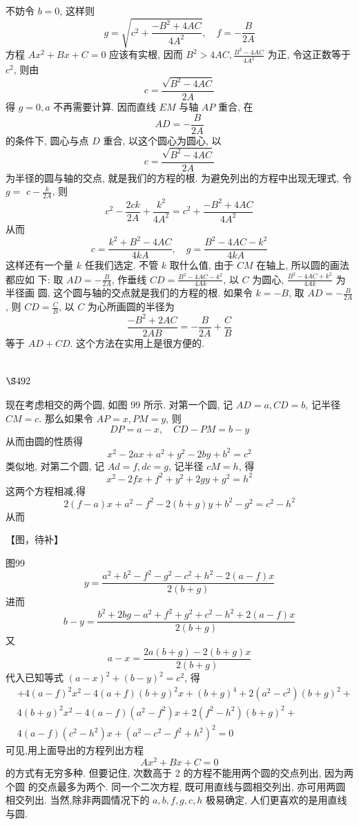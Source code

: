 不妨令 $b=0$, 这样则
\[
g=\sqrt{c^{2}+\frac{-B^{2}+4 A C}{4 A^{2}}}, \quad f=-\frac{B}{2 A}
\]
方程 $A x^{2}+B x+C=0$ 应该有实根, 因而 $B^{2}>4 A C, \frac{B^{2}-4 A C}{4 A^{2}}$ 为正, 令这正数等于 $c^{2}$, 则由
\[
c=\frac{\sqrt{B^{2}-4 A C}}{2 A}
\]
得 $g=0, a$ 不再需要计算. 因而直线 $E M$ 与轴 $A P$ 重合, 在
\[
A D=-\frac{B}{2 A}
\]
的条件下, 圆心与点 $D$ 重合, 以这个圆心为圆心, 以
\[
c=\frac{\sqrt{B^{2}-4 A C}}{2 A}
\]
为半径的圆与轴的交点, 就是我们的方程的根. 为避免列出的方程中出现无理式, 令 $g=$ $c-\frac{k}{2 A}$, 则
\[
c^{2}-\frac{2 c k}{2 A}+\frac{k^{2}}{4 A^{2}}=c^{2}+\frac{-B^{2}+4 A C}{4 A^{2}}
\]
从而
\[
c=\frac{k^{2}+B^{2}-4 A C}{4 k A}, \quad g=\frac{B^{2}-4 A C-k^{2}}{4 k A}
\]
这样还有一个量 $k$ 任我们选定. 不管 $k$ 取什么值, 由于 $C M$ 在轴上, 所以圆的画法都应如 下: 取 $A D=-\frac{B}{2 A}$, 作垂线 $C D=\frac{B^{2}-4 A C-k^{2}}{4 A k}$, 以 $C$ 为圆心, $\frac{B^{2}-4 A C+k^{2}}{4 A k}$ 为半径画 圆, 这个圆与轴的交点就是我们的方程的根. 如果令 $k=-B$, 取 $A D=-\frac{B}{2 A}$, 则 $C D=\frac{C}{B}$, 以 $C$ 为心所画圆的半径为
\[
\frac{-B^{2}+2 A C}{2 A B}=-\frac{B}{2 A}+\frac{C}{B}
\]
等于 $A D+C D$. 这个方法在实用上是很方便的.

\section{$\S 492$}

现在考虑相交的两个圆, 如图 99 所示. 对第一个圆, 记 $A D=a, C D=b$, 记半径 $C M=c$. 那么如果令 $A P=x, P M=y$, 则
\[
D P=a-x, \quad C D-P M=b-y
\]
从而由圆的性质得
\[
x^{2}-2 a x+a^{2}+y^{2}-2 b y+b^{2}=c^{2}
\]
类似地, 对第二个圆, 记 $A d=f, d c=g$, 记半径 $c M=h$, 得
\[
x^{2}-2 f x+f^{2}+y^{2}+2 g y+g^{2}=h^{2}
\]
这两个方程相减,得
\[
2(f-a) x+a^{2}-f^{2}-2(b+g) y+b^{2}-g^{2}=c^{2}-h^{2}
\]
从而


【图，待补】

图99
\[
y=\frac{a^{2}+b^{2}-f^{2}-g^{2}-c^{2}+h^{2}-2(a-f) x}{2(b+g)}
\]
进而
\[
b-y=\frac{b^{2}+2 b g-a^{2}+f^{2}+g^{2}+c^{2}-h^{2}+2(a-f) x}{2(b+g)}
\]
又
\[
a-x=\frac{2 a(b+g)-2(b+g) x}{2(b+g)}
\]
代入已知等式 $(a-x)^{2}+(b-y)^{2}=c^{2}$, 得
\[
\begin{aligned}
& +4(a-f)^{2} x^{2}-4(a+f)(b+g)^{2} x+(b+g)^{4}+2\left(a^{2}-c^{2}\right)(b+g)^{2}+ \\
& 4(b+g)^{2} x^{2}-4(a-f)\left(a^{2}-f^{2}\right) x+2\left(f^{2}-h^{2}\right)(b+g)^{2}+ \\
& 4(a-f)\left(c^{2}-h^{2}\right) x+\left(a^{2}-c^{2}-f^{2}+h^{2}\right)^{2}=0
\end{aligned}
\]
可见,用上面导出的方程列出方程
\[
A x^{2}+B x+C=0
\]
的方式有无穷多种. 但要记住, 次数高于 2 的方程不能用两个圆的交点列出, 因为两个圆 的交点最多为两个. 同一个二次方程, 既可用直线与圆相交列出, 亦可用两圆相交列出. 当然,除非两圆情况下的 $a, b, f, g, c, h$ 极易确定, 人们更喜欢的是用直线与圆.

